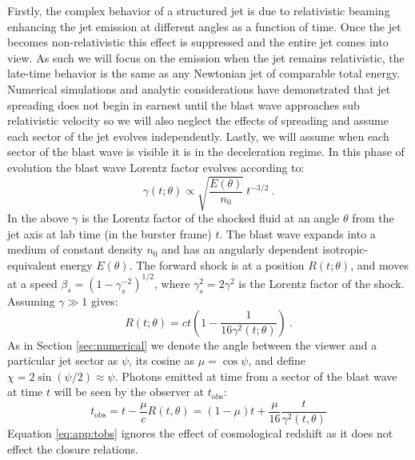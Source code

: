 \documentclass[twocolumn]{aastex62}
\newcommand{\tobs}{\ensuremath{t_{\mathrm{obs}}}}
\begin{document}
  Firstly, the complex behavior of a structured jet is due to relativistic beaming enhancing the jet emission at different angles as a function of time.  Once the jet becomes non-relativistic this effect is suppressed and the entire jet comes into view.  As such we will focus on the emission when the jet remains relativistic, the late-time behavior is the same as any Newtonian jet of comparable total energy.  Numerical simulations and analytic considerations have demonstrated that jet spreading does not begin in earnest until the blast wave approaches sub relativistic velocity so we will also neglect the effects of spreading and assume each sector of the jet evolves independently.  Lastly, we will assume when each sector of the blast wave is visible it is in the deceleration regime.  In this phase of evolution the blast wave Lorentz factor evolves according to:
  \begin{equation}
	\gamma(t; \theta) \propto \sqrt{\frac{E(\theta)}{n_0}}\ t^{-3/2}\ . \label{eq:app:lorentzEvolution}
\end{equation}
  In the above $\gamma$ is the Lorentz factor of the shocked fluid at an angle $\theta$ from the jet axis at lab time (in the burster frame) $t$.  The blast wave expands into a medium of constant density $n_0$ and has an angularly dependent isotropic-equivalent energy $E(\theta)$.  The forward shock is at a position $R(t; \theta)$, and moves at a speed $\beta_s = (1-\gamma_s^{-2})^{1/2}$, where $\gamma_s^2 = 2 \gamma^2$ is the Lorentz factor of the shock.  Assuming $\gamma \gg 1$ gives:
\begin{equation}
	R(t; \theta) = ct\left(1-\frac{1}{16 \gamma^2(t; \theta)}\right)\ .
\end{equation}
As in Section \ref{sec:numerical} we denote the angle between the viewer and a particular jet sector as $\psi$, its cosine as $\mu = \cos \psi$, and define $\chi = 2 \sin(\psi/2) \approx \psi$.  Photons emitted at time from a sector of the blast wave at time $t$ will be seen by the observer at $\tobs$:
\begin{equation}
	\tobs = t - \frac{\mu}{c} R(t,\theta) = (1-\mu)t + \frac{\mu}{16}\frac{t}{ \gamma^2(t,\theta)} \label{eq:app:tobs}
\end{equation}
Equation \eqref{eq:app:tobs} ignores the effect of cosmological redshift as it does not effect the closure relations.
\end{document}
